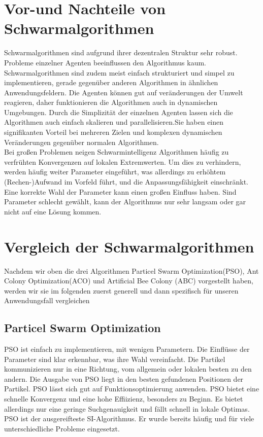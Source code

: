 \section{Vor-und Nachteile von Schwarmalgorithmen}
Schwarmalgorithmen sind aufgrund ihrer dezentralen Struktur sehr robust. Probleme einzelner Agenten beeinflussen den Algorithmus kaum. Schwarmalgorithmen sind zudem meist einfach strukturiert und simpel zu implementieren, gerade gegenüber anderen Algorithmen in ähnlichen Anwendungsfeldern. Die Agenten können gut auf veränderungen der Umwelt reagieren, daher funktionieren die Algorithmen auch in dynamischen Umgebungen. Durch die Simplizität der einzelnen Agenten lassen sich die Algorithmen auch einfach skalieren und parallelisieren.Sie haben einen signifikanten Vorteil bei mehreren Zielen und komplexen dynamischen Veränderungen gegenüber normalen Algorithmen. \\

Bei großen Problemen neigen Schwarmintelligenz Algorithmen häufig zu verfrühten Konvergenzen auf lokalen Extremwerten. Um dies zu verhindern, werden häufig weiter Parameter eingeführt, was allerdings zu erhöhtem (Rechen-)Aufwand im Vorfeld führt, und die Anpassungsfähigkeit einschränkt.\cite {wu2022review} Eine korrekte Wahl der Parameter kann einen großen Einfluss haben. Sind Parameter schlecht gewählt, kann der Algorithmus nur sehr langsam oder gar nicht auf eine Lösung kommen.





\section{Vergleich der Schwarmalgorithmen}

Nachdem wir oben die drei Algorithmen Particel Swarm Optimization(PSO), Ant Colony Optimization(ACO) und  Artificial Bee Colony (ABC) vorgestellt haben, werden wir sie im folgenden zuerst generell und dann spezifisch für unseren Anwendungsfall vergleichen\\

\subsection{Particel Swarm Optimization}
PSO ist einfach zu implementieren, mit wenigen Parametern. Die Einflüsse der Parameter sind klar erkennbar, was ihre Wahl vereinfacht. Die Partikel kommunizieren nur in eine Richtung, vom allgemein oder lokalen besten zu den andern. Die Ausgabe von PSO liegt in den besten gefundenen Positionen der Partikel. PSO lässt sich gut auf Funktionsoptimierung anwenden. PSO bietet eine schnelle Konvergenz und eine hohe Effiizienz, besonders zu Beginn. Es bietet allerdings nur eine geringe Suchgenauigkeit und fällt schnell in lokale Optimas. \cite {yu2015swarm} PSO ist der ausgereifteste SI-Algorithmus. Er wurde bereits häufig und für viele unterschiedliche Probleme eingesetzt. 


